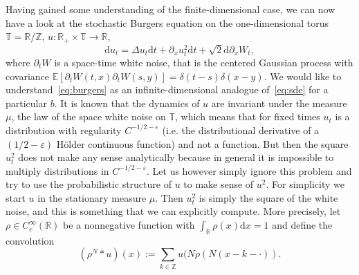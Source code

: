\documentclass[a4paper,11pt]{article}
\newcommand{\R}{\mathbb{R}}
\newcommand{\Z}{\mathbb{Z}}
\newcommand{\T}{\mathbb{T}}
\newcommand{\E}{\mathbb{E}}
\newcommand{\1}{\mathds{1}}
\newcommand{\dd}{\mathrm{d}}
\begin{document}
Having gained some understanding of the finite-dimensional case, we can now have a look at the stochastic Burgers equation on the one-dimensional torus $\T = \R / \Z$, $u \colon \R_+ \times \T \to \R$,
\begin{equation}\label{eq:burgers}
   \dd u_t = \Delta u_t \dd t + \partial_x u^2_t \dd t + \sqrt{2} \dd \partial_x W_t,
\end{equation}
where $\partial_t W$ is a space-time white noise, that is the centered Gaussian process with covariance $\E[\partial_t W(t,x) \partial_t W(s,y)] = \delta(t-s) \delta(x-y)$. We would like to understand~\eqref{eq:burgers} as an infinite-dimensional analogue of~\eqref{eq:sde} for a particular $b$. It is known that the dynamics of $u$ are invariant under the measure $\mu$, the law of the space white noise on $\T$, which means that for fixed times $u_t$ is a distribution with regularity $C^{-1/2-\varepsilon}$ (i.e. the distributional derivative of a $(1/2-\varepsilon)$ H\"older continuous function) and not a function. But then the square $u^2_t$ does not make any sense analytically because in general it is impossible to multiply distributions in $C^{-1/2-\varepsilon}$. Let us however simply ignore this problem and try to use the probabilistic structure of $u$ to make sense of $u^2$. For simplicity we start $u$ in the stationary measure $\mu$. Then $u_t^2$ is simply the square of the white noise, and this is something that we can explicitly compute. More precisely, let $\rho \in C^\infty_c(\R)$ be a nonnegative function with $\int_\R \rho(x) \dd x = 1$ and define the convolution
\[
  (\rho^N \ast u)(x) := \sum_{k \in \Z} u(N \rho(N(x - k -\cdot)) .
\]
\end{document}
